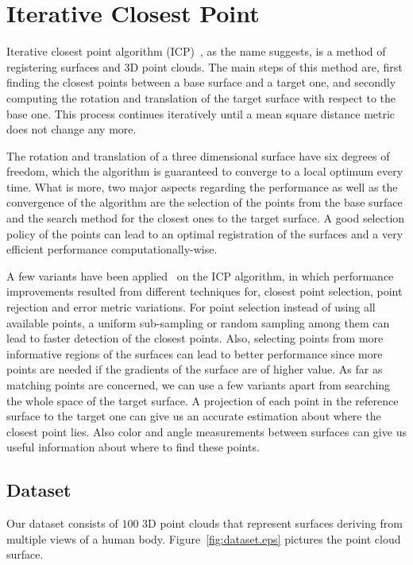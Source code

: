 \section{Iterative Closest Point}
\label{icp}

Iterative closest point algorithm (ICP)~\cite{icpOr}, as the name suggests, is a method of registering surfaces and 3D point clouds. The main steps of this method are, first  finding the closest points between a base surface and a target one, and secondly computing the rotation and translation of the target surface with respect to the base one. This process continues iteratively until a mean square distance metric does not change any more.

The rotation and translation of a three dimensional surface have six degrees of freedom, which the algorithm is guaranteed to converge to a local optimum every time. What is more, two major aspects regarding the performance as well as the convergence of the algorithm are the selection of the points from the base surface and the search method for the closest ones to the target surface. A good selection policy of the points can lead to an optimal registration of the surfaces and a very efficient performance computationally-wise.

A few variants have been applied~\cite{icpVar} on the ICP algorithm, in which performance improvements resulted from different techniques for, closest point selection, point rejection and error metric variations. For point selection instead of using all available points, a uniform sub-sampling or random sampling among them can lead to faster detection of the closest points. Also, selecting points from more informative regions of the surfaces can lead to better performance since more points are needed if the gradients of the surface are of higher value. As far as matching points are concerned, we can use a few variants apart from searching the whole space of the target surface. A projection of each point in the reference surface to the target one can give us an accurate estimation about where the closest point lies. Also color and angle measurements between surfaces can give us useful information about where to find these points.

\subsection{Dataset}
Our dataset consists of $100$ 3D point clouds that represent surfaces deriving from multiple views of a human body. Figure~\ref{fig:dataset.eps} pictures the point cloud surface.

